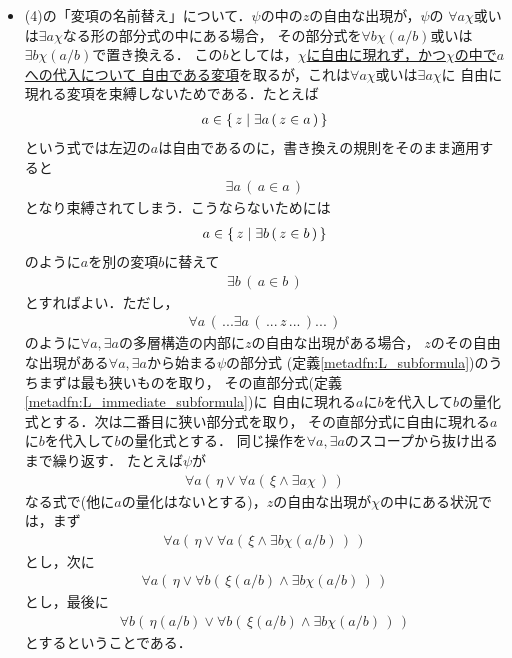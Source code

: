 \begin{itemize}
		\item (4)の「変項の名前替え」について．$\psi$の中の$z$の自由な出現が，$\psi$の
			$\forall a \chi$或いは$\exists a \chi$なる形の部分式の中にある場合，
			その部分式を$\forall b \chi(a/b)$或いは$\exists b \chi(a/b)$で置き換える．
			この$b$としては，\underline{$\chi$に自由に現れず，かつ$\chi$の中で$a$への代入について
			自由である変項}を取るが，これは$\forall a \chi$或いは$\exists a \chi$に
			自由に現れる変項を束縛しないためである．たとえば
			\begin{align}
				a \in \{\, z \mid \exists a\, (\, z \in a\, )\, \}
			\end{align}
			という式では左辺の$a$は自由であるのに，書き換えの規則をそのまま適用すると
			\begin{align}
				\exists a\, (\, a \in a\, )
			\end{align}
			となり束縛されてしまう．こうならないためには
			\begin{align}
				a \in \{\, z \mid \exists b\, (\, z \in b\, )\, \}
			\end{align}
			のように$a$を別の変項$b$に替えて
			\begin{align}
				\exists b\, (\, a \in b\, )
			\end{align}
			とすればよい．ただし，
			\begin{align}
				\forall a\, (\, ...\exists a\, (\, ...\, z\, ...\, )...\, )
			\end{align}
			のように$\forall a,\exists a$の多層構造の内部に$z$の自由な出現がある場合，
			$z$のその自由な出現がある$\forall a,\exists a$から始まる$\psi$の部分式
			(定義\ref{metadfn:L_subformula})のうちまずは最も狭いものを取り，
			その直部分式(定義\ref{metadfn:L_immediate_subformula})に
			自由に現れる$a$に$b$を代入して$b$の量化式とする．次は二番目に狭い部分式を取り，
			その直部分式に自由に現れる$a$に$b$を代入して$b$の量化式とする．
			同じ操作を$\forall a,\exists a$のスコープから抜け出るまで繰り返す．
			たとえば$\psi$が
			\begin{align}
				\forall a (\, \eta \vee \forall a (\, \xi \wedge \exists a \chi\, )\, )
			\end{align}
			なる式で(他に$a$の量化はないとする)，$z$の自由な出現が$\chi$の中にある状況では，まず
			\begin{align}
				\forall a (\, \eta \vee \forall a (\, \xi \wedge \exists b \chi(a/b)\, )\, )
			\end{align}
			とし，次に
			\begin{align}
				\forall a (\, \eta \vee \forall b (\, \xi(a/b) \wedge \exists b \chi(a/b)\, )\, )
			\end{align}
			とし，最後に
			\begin{align}
				\forall b (\, \eta(a/b) \vee \forall b (\, \xi(a/b) \wedge \exists b \chi(a/b)\, )\, )
			\end{align}
			とするということである．
	\end{itemize}
	
